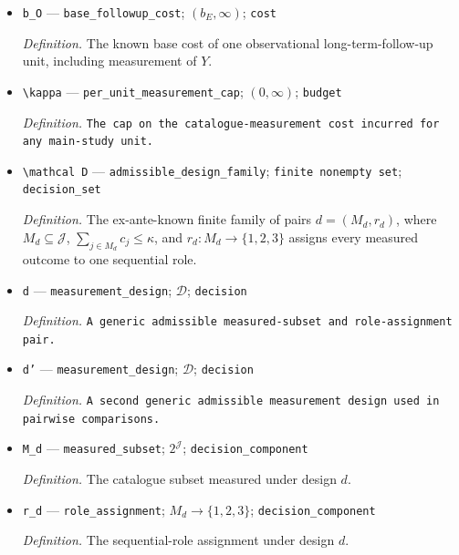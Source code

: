 \documentclass{article}
\begin{document}
\begin{itemize}
  \par\smallskip\noindent\emph{Definition.} \texttt{The known base cost of one experimental unit before catalogue measurements.}
  \item \texttt{b\_\allowbreak{}O} --- \texttt{base\_\allowbreak{}followup\_\allowbreak{}cost}; \((b_E,\infty)\); \texttt{cost}
  \par\smallskip\noindent\emph{Definition.} The known base cost of one observational long-term-follow-up unit, including measurement of \(Y\).
  \item \texttt{\textbackslash{}\allowbreak{}kappa} --- \texttt{per\_\allowbreak{}unit\_\allowbreak{}measurement\_\allowbreak{}cap}; \((0,\infty)\); \texttt{budget}
  \par\smallskip\noindent\emph{Definition.} \texttt{The cap on the catalogue-\allowbreak{}measurement cost incurred for any main-\allowbreak{}study unit.}
  \item \texttt{\textbackslash{}\allowbreak{}mathcal D} --- \texttt{admissible\_\allowbreak{}design\_\allowbreak{}family}; \texttt{finite nonempty set}; \texttt{decision\_\allowbreak{}set}
  \par\smallskip\noindent\emph{Definition.} The ex-ante-known finite family of pairs \(d=(M_d,r_d)\), where \(M_d\subseteq\mathcal J\), \(\sum_{j\in M_d}c_j\le\kappa\), and \(r_d:M_d\to\{1,2,3\}\) assigns every measured outcome to one sequential role.
  \item \texttt{d} --- \texttt{measurement\_\allowbreak{}design}; \(\mathcal D\); \texttt{decision}
  \par\smallskip\noindent\emph{Definition.} \texttt{A generic admissible measured-\allowbreak{}subset and role-\allowbreak{}assignment pair.}
  \item \texttt{d'} --- \texttt{measurement\_\allowbreak{}design}; \(\mathcal D\); \texttt{decision}
  \par\smallskip\noindent\emph{Definition.} \texttt{A second generic admissible measurement design used in pairwise comparisons.}
  \item \texttt{M\_\allowbreak{}d} --- \texttt{measured\_\allowbreak{}subset}; \(2^{\mathcal J}\); \texttt{decision\_\allowbreak{}component}
  \par\smallskip\noindent\emph{Definition.} The catalogue subset measured under design \(d\).
  \item \texttt{r\_\allowbreak{}d} --- \texttt{role\_\allowbreak{}assignment}; \(M_d\to\{1,2,3\}\); \texttt{decision\_\allowbreak{}component}
  \par\smallskip\noindent\emph{Definition.} The sequential-role assignment under design \(d\).

\end{itemize}
\end{document}
